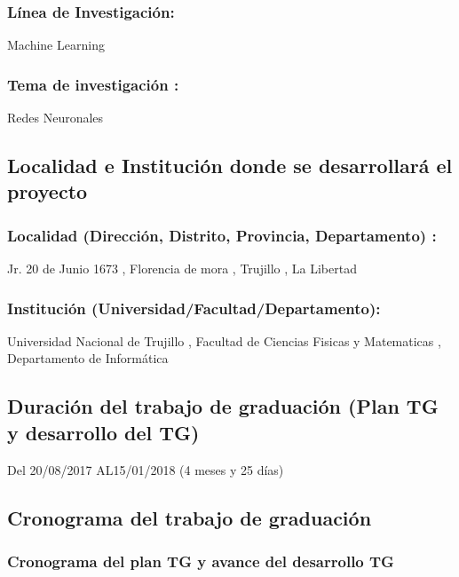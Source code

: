 \documentclass[a4paper, 12pt]{article}
\begin{document}
\subsubsection{Línea de Investigación:} Machine Learning
\subsubsection{Tema de investigación :} Redes Neuronales


\subsection{Localidad e Institución donde se desarrollará el proyecto }
  
\subsubsection{Localidad (Dirección, Distrito, Provincia, Departamento) :} Jr. 20 de Junio 1673 , Florencia de mora , Trujillo , La Libertad 
\subsubsection{Institución (Universidad/Facultad/Departamento):} Universidad Nacional de Trujillo , Facultad de Ciencias Fisicas y Matematicas , Departamento de Informática

  
\subsection{Duración del trabajo de graduación (Plan TG y desarrollo del TG)}
\hspace*{0.7cm}Del \hspace*{0.2cm}20/08/2017 \hspace*{0.3cm} AL\hspace*{0.2cm}15/01/2018  \hspace*{0.2cm}(4 meses y 25 días)
  
    
  
  
\subsection{Cronograma del trabajo de graduación}


\subsubsection{Cronograma del plan TG y avance del desarrollo TG }
\end{document}
